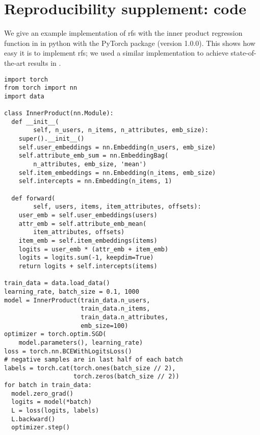 
\appendix
\clearpage
\section{Reproducibility supplement: code}
\label{sec:code}
We give an example implementation of \acrlong{rfs} with the inner product
regression function in  in python with the PyTorch
package (version 1.0.0). This shows how easy it is to implement \gls{rfs}; we
used a similar implementation to achieve state-of-the-art results in
.
\begin{verbatim}
import torch
from torch import nn
import data

class InnerProduct(nn.Module):
  def __init__(
        self, n_users, n_items, n_attributes, emb_size):
    super().__init__()
    self.user_embeddings = nn.Embedding(n_users, emb_size)
    self.attribute_emb_sum = nn.EmbeddingBag(
        n_attributes, emb_size, 'mean')
    self.item_embeddings = nn.Embedding(n_items, emb_size)
    self.intercepts = nn.Embedding(n_items, 1)

  def forward(
        self, users, items, item_attributes, offsets):
    user_emb = self.user_embeddings(users)
    attr_emb = self.attribute_emb_mean(
        item_attributes, offsets)
    item_emb = self.item_embeddings(items)
    logits = user_emb * (attr_emb + item_emb)
    logits = logits.sum(-1, keepdim=True)
    return logits + self.intercepts(items)

train_data = data.load_data()
learning_rate, batch_size = 0.1, 1000
model = InnerProduct(train_data.n_users,
                     train_data.n_items,
                     train_data.n_attributes,
                     emb_size=100)
optimizer = torch.optim.SGD(
    model.parameters(), learning_rate)
loss = torch.nn.BCEWithLogitsLoss()
# negative samples are in last half of each batch
labels = torch.cat(torch.ones(batch_size // 2),
                   torch.zeros(batch_size // 2))
for batch in train_data:
  model.zero_grad()
  logits = model(*batch)
  L = loss(logits, labels)
  L.backward()
  optimizer.step()
\end{verbatim}




